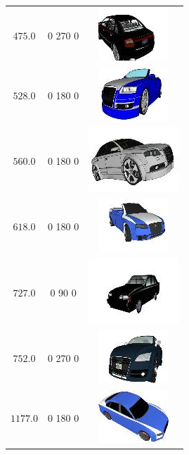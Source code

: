 \begin{longtable}{ccc}
	$475.0$ & 0 270 0 & \includegraphics{models/8835f7ff30d4f71f531e940de4b7770d.jpg}\\
	$528.0$ & 0 180 0 & \includegraphics{models/4c2412cf0f720bb9618e9d35559b7aa.jpg}\\
	$560.0$ & 0 180 0 & \includegraphics{models/3a5ce33bac316d8f6379c5e421c1d27.jpg}\\
	$618.0$ & 0 180 0 & \includegraphics{models/9574bf3d299f0d44681d94bb8953eef.jpg}\\
	$727.0$ & 0 90 0 & \includegraphics{models/158a50b322e818beac301ac18d4fb5ee.jpg}\\
	$752.0$ & 0 270 0 & \includegraphics{models/cce8756041509daa406c1204dc8ac9d0.jpg}\\
	$1177.0$ & 0 180 0 & \includegraphics{models/8ac7890563ef1e1ccfd826dd468a5497.jpg}\\

\end{longtable}
